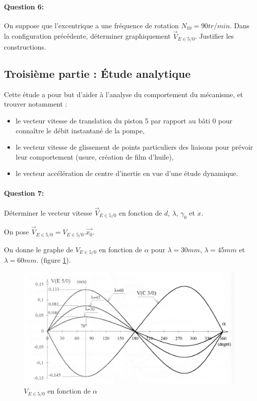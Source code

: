\paragraph{Question 6:} On suppose que l'excentrique a une fréquence de rotation $N_{10}=90tr/min$. Dans la configuration précédente, déterminer graphiquement $\vec{V}_{E\in 5/0}$. Justifier les constructions.

\subsection{Troisième partie : Étude analytique}

Cette étude a pour but d'aider à l'analyse du comportement du mécanisme, et trouver notamment :
\begin{itemize}
 \item le vecteur vitesse de translation du piston 5 par rapport au bâti 0 pour connaître le débit instantané de la pompe,
 \item le vecteur vitesse de glissement de points particuliers des liaisons pour prévoir leur comportement (usure, création de film d'huile),
 \item le vecteur accélération de centre d'inertie en vue d'une étude dynamique.
\end{itemize}

\paragraph{Question 7:} Déterminer le vecteur vitesse $\vec{V}_{E\in 5/0}$ en fonction de $d$, $\lambda$, $\gamma_0$ et $\dot{x}$.

On pose $\vec{V}_{E\in 5/0}=V_{E\in 5/0}.\overrightarrow{x_0}$.

On donne le graphe de $V_{ E\in 5/0}$ en fonction de $\alpha$ pour $\lambda=30mm$, $\lambda=45mm$ et $\lambda=60mm$. (figure \ref{commande_figure_2}).

\begin{figure}[!ht]
\begin{center}
\includegraphics[width=0.6\linewidth]{img/commande_figure_2}
\caption{$V_{ E\in 5/0}$ en fonction de $\alpha$}
\label{commande_figure_2}
\end{center}
\end{figure}

